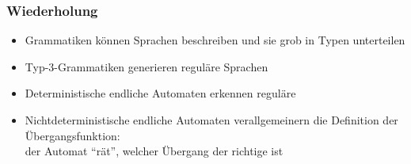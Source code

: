 \documentclass[onlymath]{beamer}
\begin{document}
% 
% 

\maketitle


\begin{frame}\frametitle{Wiederholung}

\begin{itemize}
\item Grammatiken können Sprachen beschreiben und sie grob in Typen unterteilen
\item Typ-3-Grammatiken \alert{generieren} reguläre Sprachen
\item Deterministische endliche Automaten \alert{erkennen} reguläre 
\item Nichtdeterministische endliche Automaten verallgemeinern die Definition der Übergangsfunktion:\\ der Automat "`rät"', welcher Übergang der richtige ist
\end{itemize}

\end{frame}
\end{document}
